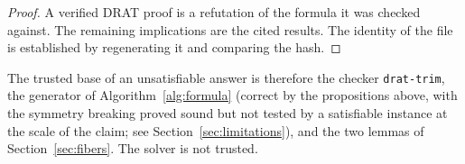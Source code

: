 \begin{proof}
A verified DRAT proof is a refutation of the formula it was checked against. The remaining implications are the cited results. The identity of the file is established by regenerating it and comparing the hash.
\end{proof}

The trusted base of an unsatisfiable answer is therefore the checker \texttt{drat-trim}, the generator of Algorithm~\ref{alg:formula} (correct by the propositions above, with the symmetry breaking proved sound but not tested
by a satisfiable instance at the scale of the claim; see Section~\ref{sec:limitations}), and the two lemmas of Section~\ref{sec:fibers}. The solver is not trusted.
